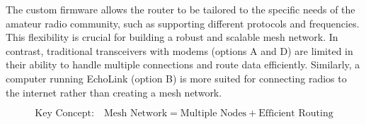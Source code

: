 The custom firmware allows the router to be tailored to the specific needs of the amateur radio community, such as supporting different protocols and frequencies. This flexibility is crucial for building a robust and scalable mesh network. In contrast, traditional transceivers with modems (options A and D) are limited in their ability to handle multiple connections and route data efficiently. Similarly, a computer running EchoLink (option B) is more suited for connecting radios to the internet rather than creating a mesh network.

\[
\text{Key Concept:} \quad \text{Mesh Network} = \text{Multiple Nodes} + \text{Efficient Routing}
\]

